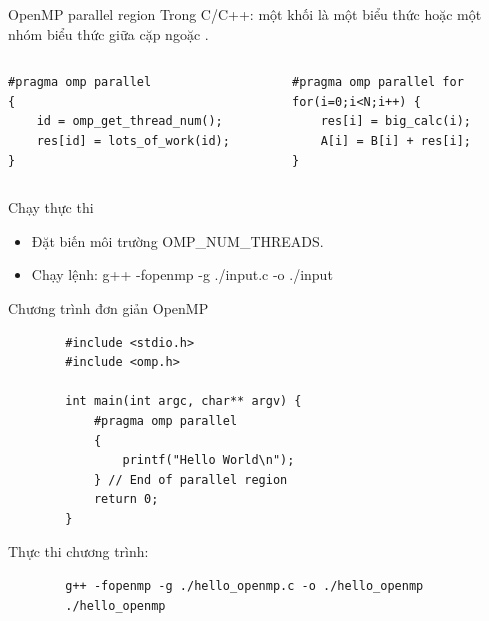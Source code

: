 \documentclass[10pt]{beamer}
\theoremstyle{remark}
\numberwithin{algocf}{section}
\numberwithin{equation}{section}
\numberwithin{dl}{section}
\numberwithin{figure}{section}
\begin{document}
\begin{frame}[fragile]{OpenMP parallel region}
    Trong C/C++: một khối là một biểu thức hoặc một nhóm biểu thức giữa cặp ngoặc { }.
    \begin{columns}[onlytextwidth]
        \begin{column}{0.5\linewidth}
            \begin{verbatim}
#pragma omp parallel
{
    id = omp_get_thread_num();
    res[id] = lots_of_work(id);
}
            \end{verbatim}
        \end{column}
        \begin{column}{0.5\linewidth}
            \begin{verbatim}
#pragma omp parallel for
for(i=0;i<N;i++) {
    res[i] = big_calc(i);
    A[i] = B[i] + res[i];
} 
            \end{verbatim}
        \end{column}
    \end{columns}
\end{frame}

\begin{frame}{Chạy thực thi}
    \begin{itemize}
        \item Đặt biến môi trường OMP\_NUM\_THREADS.
        \item Chạy lệnh: g++ -fopenmp -g ./input.c -o ./input
    \end{itemize}
\end{frame}

\begin{frame}{Chương trình đơn giản OpenMP}
    \begin{verbatim}
        #include <stdio.h>
        #include <omp.h>

        int main(int argc, char** argv) {
            #pragma omp parallel
            {
                printf("Hello World\n");
            } // End of parallel region 
            return 0;
        }
    \end{verbatim}
    Thực thi chương trình:
    \begin{verbatim}
        g++ -fopenmp -g ./hello_openmp.c -o ./hello_openmp
        ./hello_openmp
    \end{verbatim}
\end{frame}
\end{document}
